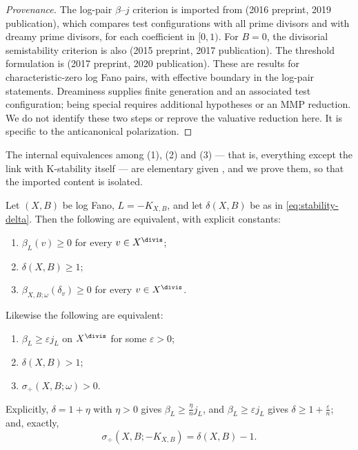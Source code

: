 \begin{proof}[Provenance]
The log-pair $\beta$--$j$ criterion is imported from
\cite[Theorem~6.5]{Fuj19} (2016 preprint, 2019 publication), which
compares test configurations with all prime divisors and with dreamy prime
divisors, for each coefficient in $[0,1)$.  For $B=0$, the divisorial
semistability criterion is also \cite[Theorem~3.7]{Li17}
(2015 preprint, 2017 publication).  The threshold formulation is
\cite[Theorem~B]{BJ20} (2017 preprint, 2020 publication).
These are results for characteristic-zero log Fano pairs, with effective
boundary in the log-pair statements.  Dreaminess supplies finite
generation and an associated test configuration; being special requires
additional hypotheses or an MMP reduction.  We do not identify these two
steps or reprove the valuative reduction here.  It is specific to the
anticanonical polarization.
\end{proof}

The internal equivalences among (1), (2) and (3) --- that is, everything
except the link with K-stability itself --- are elementary given
, and we prove them, so that the imported
content is isolated.

\begin{proposition}
\label{prop:ch50-valuative-internal}
Let $(X,B)$ be log Fano, $L=-K_{X,B}$, and let $\delta(X,B)$ be as in
\eqref{eq:stability-delta}.  Then the following are equivalent, with
explicit constants:
\begin{enumerate}
\item\label{itm:ch50-vi:beta}
      $\beta_L(v)\ge0$ for every $v\in X^{\divis}$;
\item\label{itm:ch50-vi:delta1}
      $\delta(X,B)\ge1$;
\item\label{itm:ch50-vi:beta-dirac}
      $\beta_{X,B;\omega}(\delta_v)\ge0$ for every $v\in X^{\divis}$.
\end{enumerate}
Likewise the following are equivalent:
\begin{enumerate}[resume]
\item\label{itm:ch50-vi:betaj}
      $\beta_L\ge\varepsilon j_L$ on $X^{\divis}$ for some
      $\varepsilon>0$;
\item\label{itm:ch50-vi:deltabig}
      $\delta(X,B)>1$;
\item\label{itm:ch50-vi:sigmadiv}
      $\sigma_{\div}(X,B;\omega)>0$.
\end{enumerate}
Explicitly, $\delta=1+\eta$ with $\eta>0$ gives
$\beta_L\ge\frac\eta nj_L$, and $\beta_L\ge\varepsilon j_L$ gives
$\delta\ge1+\frac\varepsilon n$; and, exactly,
\[\sigma_{\div}(X,B;-K_{X,B})=\delta(X,B)-1.
\tag{50.83a}\label{eq:ch50-fano-div-threshold}\]
\end{proposition}

